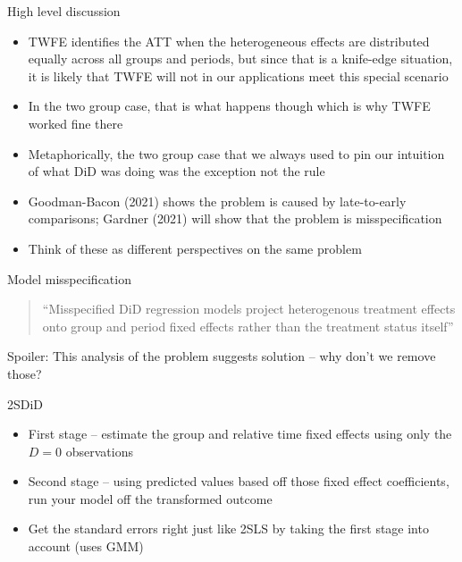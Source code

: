 \documentclass{beamer}
\begin{document}
\begin{frame}{High level discussion}

\begin{itemize}
\item TWFE identifies the ATT when the heterogeneous effects are distributed equally across all groups and periods, but since that is a knife-edge situation, it is likely that TWFE will not in our applications meet this special scenario
\item In the two group case, that is what happens though which is why TWFE worked fine there
\item Metaphorically, the two group case that we always used to pin our intuition of what DiD was doing was the exception not the rule
\item Goodman-Bacon (2021) shows the problem is caused by late-to-early comparisons; Gardner (2021) will show that the problem is misspecification
\item Think of these as different perspectives on the same problem
\end{itemize}

\end{frame}

\begin{frame}{Model misspecification}

\begin{quote}
``Misspecified DiD regression models project heterogenous treatment effects onto group and period fixed effects rather than the treatment status itself''
\end{quote}

\bigskip

Spoiler: This analysis of the problem suggests solution -- why don't we remove those?

\end{frame}


\begin{frame}{2SDiD}

\begin{itemize}
\item First stage -- estimate the group and relative time fixed effects using only the $D=0$ observations
\item Second stage -- using predicted values based off those fixed effect coefficients, run your model off the transformed outcome 
\item Get the standard errors right just like 2SLS by taking the first stage into account (uses GMM)
\end{itemize}

\end{frame}
\end{document}
